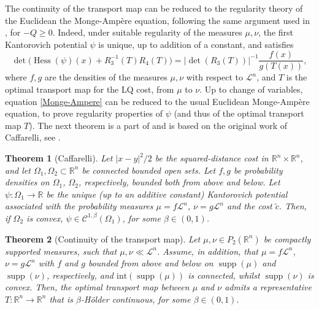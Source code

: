 \documentclass[reqno]{amsart}
\DeclareMathOperator{\supp}{supp}
\DeclareMathOperator{\Hess}{Hess}
\theoremstyle{plain}
\newtheorem{thm}{Theorem}[section]
\theoremstyle{definition}
\theoremstyle{remark}
\begin{document}
    The continuity of the transport map can be reduced to the regularity theory of the Euclidean the Monge-Amp\`ere equation, following the same argument used in \cite[Theorem 2.2]{hinpomriff2011}, for $-Q\geq 0$.  Indeed, under suitable regularity of the measures $\mu,\nu$, the first Kantorovich potential $\psi$ is unique, up to addition of a constant, and satisfies 
    \begin{equation}\label{Monge-Ampere}
			\det\big(\Hess(\psi)(x)+R_3^{-1}(T)R_4(T)\big)=|\det(R_3(T))|^{-1}\frac{f(x)}{g(T(x))},
    \end{equation}
    where $f,g$ are the densities of the measures $\mu,\nu$ with respect to $\mathscr{L}^n$, and $T$ is the optimal transport map for the LQ cost, from $\mu$ to $\nu$. Up to change of variables, equation \eqref{Monge-Ampere} can be reduced to the usual Euclidean Monge-Amp\`ere equation, to prove regularity properties of $\psi$ (and thus of the optimal transport map $T$).
    The next theorem is a part of \cite[Theorem 12.50]{Villanioldandnew} and is based on the original work of Caffarelli, see \cite{CaffarelliRegConvMaps}.
		\begin{thm}[Caffarelli]\label{Caffarelli_regularity}
			Let $|x-y|^2/2$ be the squared-distance cost in $\mathbb{R}^n\times\mathbb{R}^n$, and let $\Omega_1,\Omega_2\subset\mathbb{R}^n$ be connected bounded open sets. Let $f,g$ be probability densities on $\Omega_1$, $\Omega_2$, respectively, bounded both from above and below. Let $\psi:\Omega_1\to\mathbb{R}$ be the unique (up to an additive constant) Kantorovich potential associated with the probability measures $\mu=f\mathscr{L}^n$, $\nu=g\mathscr{L}^n$ and the cost $\tilde{c}$. Then, if $\Omega_2$ is convex, $\psi\in\mathcal{C}^{1,\beta}(\Omega_1)$, for some $\beta\in(0,1)$.
		\end{thm}
		\begin{thm}[Continuity of the transport map]\label{continuity_transport_map}
			Let $\mu, \nu\in P_2(\mathbb{R}^n)$ be compactly supported measures, such that $\mu,\nu\ll\mathscr{L}^n$. Assume, in addition, that $\mu=f\mathscr{L}^n$, $\nu=g\mathscr{L}^n$ with $f$ and $g$ bounded from above and below on $\supp(\mu)$ and $\supp(\nu)$, respectively, and $\mathrm{int}(\supp(\mu))$ is connected, whilst $\supp(\nu)$ is convex. Then, the optimal transport map between $\mu$ and $\nu$ admits a representative $T:\mathbb{R}^n\to\mathbb{R}^n$ that is $\beta$-Hölder continuous, for some $\beta\in(0,1)$.
		\end{thm}
\end{document}
